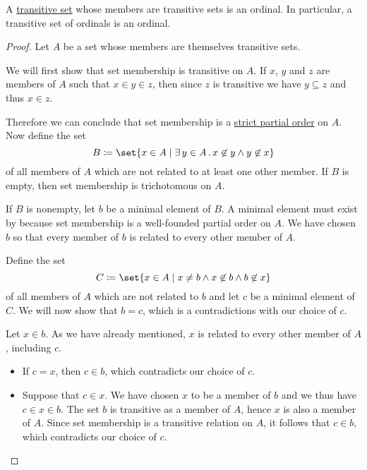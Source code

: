 \begin{proposition}\label{thm:transitive_set_of_transitive_sets_is_ordinal}
  A \hyperref[def:transitive_set]{transitive set} whose members are transitive sets is an ordinal. In particular, a transitive set of ordinals is an ordinal.
\end{proposition}
\begin{proof}
  Let \( A \) be a set whose members are themselves transitive sets.

  We will first show that set membership is transitive on \( A \). If \( x \), \( y \) and \( z \) are members of \( A \) such that \( x \in y \in z \), then since \( z \) is transitive we have \( y \subseteq z \) and thus \( x \in z \).

  Therefore we can conclude that set membership is a \hyperref[def:partially_ordered_set/strict]{strict partial order} on \( A \). Now define the set
  \begin{equation*}
    B \coloneqq \set{ x \in A \given \qexists {y \in A} x \not\in y \wedge y \not\in x }
  \end{equation*}
  of all members of \( A \) which are not related to at least one other member. If \( B \) is empty, then set membership is trichotomous on \( A \).

  If \( B \) is nonempty, let \( b \) be a minimal element of \( B \). A minimal element must exist by  because set membership is a well-founded partial order on \( A \). We have chosen \( b \) so that every member of \( b \) is related to every other member of \( A \).

  Define the set
  \begin{equation*}
    C \coloneqq \set{ x \in A \given x \neq b \wedge x \not\in b \wedge b \not\in x }
  \end{equation*}
  of all members of \( A \) which are not related to \( b \) and let \( c \) be a minimal element of \( C \). We will now show that \( b = c \), which is a contradictions with our choice of \( c \).

  Let \( x \in b \). As we have already mentioned, \( x \) is related to every other member of \( A \), including \( c \).
  \begin{itemize}
    \item If \( c = x \), then \( c \in b \), which contradicts our choice of \( c \).

    \item Suppose that \( c \in x \). We have chosen \( x \) to be a member of \( b \) and we thus have \( c \in x \in b \). The set \( b \) is transitive as a member of \( A \), hence \( x \) is also a member of \( A \). Since set membership is a transitive relation on \( A \), it follows that \( c \in b \), which contradicts our choice of \( c \).


\end{itemize}
\end{proof}

